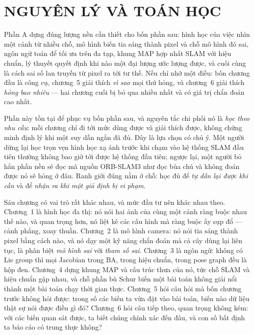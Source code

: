 \documentclass[../vslam.tex]{subfiles}
\begin{document}
\part{NGUYÊN LÝ VÀ TOÁN HỌC}
\begin{tomtat}
Phần A dựng đúng lượng nền cần thiết cho bốn phần sau: hình học của việc nhìn một cảnh từ nhiều chỗ, mô hình biến tia sáng thành pixel và chỗ mô hình đó sai, ngôn ngữ toán để tối ưu trên đa tạp, khung MAP hợp nhất SLAM với hiệu chuẩn, lý thuyết quyết định khi nào một đại lượng ước lượng được, và cuối cùng là cách sai số lan truyền từ pixel ra tới tư thế. Nếu chỉ nhớ một điều: bốn chương đầu là công cụ, chương~5 giải thích \emph{vì sao} mọi thứ hỏng, và chương~6 giải thích \emph{hỏng bao nhiêu} --- hai chương cuối bị bỏ qua nhiều nhất và có giá trị chẩn đoán cao nhất.
\end{tomtat}

Phần này tồn tại để phục vụ bốn phần sau, và nguyên tắc chi phối nó là \emph{học theo nhu cầu}: mỗi chương chỉ đi tới mức dùng được và giải thích được, không chứng minh định lý khi một suy dẫn ngắn đã đủ. Đây là lựa chọn có chủ ý. Một người dừng lại học trọn vẹn hình học xạ ảnh trước khi chạm vào hệ thống SLAM đầu tiên thường không bao giờ tới được hệ thống đầu tiên; ngược lại, một người bỏ hẳn phần nền sẽ đọc mã nguồn ORB-SLAM3 như đọc bùa chú và không đoán được nó sẽ hỏng ở đâu. Ranh giới đúng nằm ở chỗ: học đủ để \emph{tự dẫn lại được khi cần} và để \emph{nhận ra khi một giả định bị vi phạm}.

Sáu chương có vai trò rất khác nhau, và mức đầu tư nên khác nhau theo. Chương~1 là hình học đa thị: nó nói hai ảnh của cùng một cảnh ràng buộc nhau thế nào, và quan trọng hơn, nó liệt kê các cấu hình mà ràng buộc ấy sụp đổ --- cảnh phẳng, xoay thuần. Chương~2 là mô hình camera: nó nói tia sáng thành pixel bằng cách nào, và nó dạy một kỹ năng chẩn đoán mà cả cây dùng lại liên tục, là phân biệt \emph{mô hình sai} với \emph{tham số sai}. Chương~3 là ngôn ngữ: không có Lie group thì mọi Jacobian trong BA, trong hiệu chuẩn, trong pose graph đều là hộp đen. Chương~4 dựng khung MAP và cấu trúc thưa của nó, tức chỗ SLAM và hiệu chuẩn gặp nhau, và chỗ phần bù Schur biến một bài toán không giải nổi thành một bài toán chạy thời gian thực. Chương~5 hỏi câu hỏi mà bốn chương trước không hỏi được: trong số các biến ta vừa đặt vào bài toán, biến nào dữ liệu thật sự nói được điều gì đó? Chương~6 hỏi câu tiếp theo, quan trọng không kém: với các biến quan sát được, ta biết chúng chính xác đến đâu, và con số bất định ta báo cáo có trung thực không?
\end{document}
